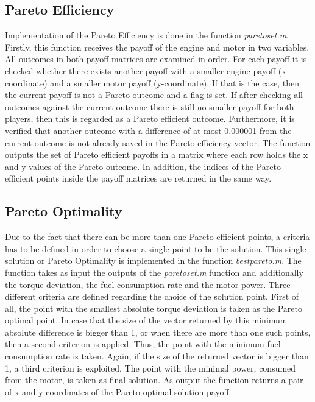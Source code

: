\subsection{Pareto Efficiency}
Implementation of the Pareto Efficiency is done in the function \textit{paretoset.m}. Firstly, this function receives the payoff of the engine and motor in two variables. All outcomes in both payoff matrices are examined in order. For each payoff it is checked whether there exists another payoff with a smaller engine payoff (x-coordinate) and a smaller motor payoff (y-coordinate). If that is the case, then the current payoff is not a Pareto outcome and a flag is set. If after checking all outcomes against the current outcome there is still no smaller payoff for both players, then this is regarded as a Pareto efficient outcome. Furthermore, it is verified that another outcome with a difference of at most 0.000001 from the current outcome is not already saved in the Pareto efficiency vector. The function outputs the set of Pareto efficient payoffs in a matrix where each row holds the x and y values of the Pareto outcome. In addition, the indices of the Pareto efficient points inside the payoff matrices are returned in the same way.

\subsection{Pareto Optimality}
Due to the fact that there can be more than one Pareto efficient points, a criteria has to be defined in order to choose a single point to be the solution. This single solution or Pareto Optimality is implemented in the function \textit{bestpareto.m}. The function takes as input the outputs of the \textit{paretoset.m} function and additionally the torque deviation, the fuel consumption rate and the motor power. Three different criteria are defined regarding the choice of the solution point. First of all, the point with the smallest absolute torque deviation is taken as the Pareto optimal point. In case that the size of the vector returned by this minimum absolute difference is bigger than 1, or when there are more than one such points, then a second criterion is applied. Thus, the point with the minimum fuel consumption rate is taken. Again, if the size of the returned vector is bigger than 1, a third criterion is exploited. The point with the minimal power, consumed from the motor, is taken as final solution. As output the function returns a pair of x and y coordinates of the Pareto optimal solution payoff.

